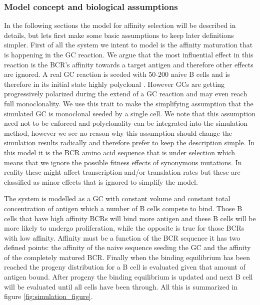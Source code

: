 \subsubsection{Model concept and biological assumptions}
In the following sections the model for affinity selection will be described in details, but lets first make some basic assumptions to keep later definitions simpler.
First of all the system we intent to model is the affinity maturation that is happening in the GC reaction.
We argue that the most influential effect in this reaction is the BCR's affinity towards a target antigen and therefore other effects are ignored.
A real GC reaction is seeded with 50-200 naive B cells and is therefore in its initial state highly polyclonal \cite{tas2016visualizing}.
However GCs are getting progressively polarized during the extend of a GC reaction \cite{tas2016visualizing} and may even reach full monoclonality.
We use this trait to make the simplifying assumption that the simulated GC is monoclonal seeded by a single cell.
We note that this assumption need not to be enforced and polyclonality can be integrated into the simulation method, however we see no reason why this assumption should change the simulation results radically and therefore prefer to keep the description simple.
In this model it is the BCR amino acid sequence that is under selection which means that we ignore the possible fitness effects of synonymous mutations.
In reality these might affect transcription and/or translation rates but these are classified as minor effects that is ignored to simplify the model.

The system is modelled as a GC with constant volume and constant total concentration of antigen which a number of B cells compete to bind.
Those B cells that have high affinity BCRs will bind more antigen and these B cells will be more likely to undergo proliferation, while the opposite is true for those BCRs with low affinity.
Affinity must be a function of the BCR sequence it has two defined points: the affinity of the naive sequence seeding the GC and the affinity of the completely matured BCR.
Finally when the binding equilibrium has been reached the progeny distribution for a B cell is evaluated given that amount of antigen bound.
After progeny the binding equilibrium is updated and next B cell will be evaluated until all cells have been through.
All this is summarized in figure \ref{fig:simulation_figure}.

